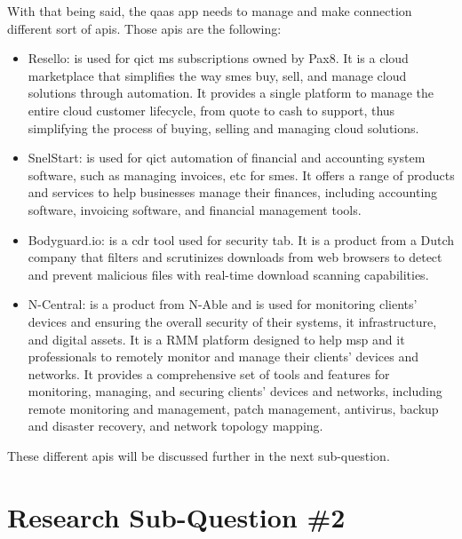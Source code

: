 \begin{multicols}{2}
      With that being said, the \acrshort{qaas} app needs to manage and make connection different sort of \acrshort{api}s.
      Those \acrshort{api}s are the following:
      \begin{itemize}
            \item Resello: is used for \acrshort{qict} \acrshort{ms} subscriptions owned by Pax8. It is a cloud
                  marketplace that simplifies the way \acrshort{sme}s buy, sell, and manage cloud solutions through
                  automation. It provides a single platform to manage the entire cloud customer lifecycle, from
                  quote to cash to support, thus simplifying the process of buying, selling and managing cloud
                  solutions.
            \item SnelStart: is used for \acrshort{qict} automation of financial and accounting system software,
                  such as managing invoices, \acrshort{etc} for \acrshort{sme}s. It offers a range of products and 
                  services to help businesses manage their finances, including accounting software, invoicing software, 
                  and financial management tools.
            \item Bodyguard.io: is a \acrshort{cdr} tool used for security tab. It is a product from a Dutch company 
                  that filters and scrutinizes downloads from web browsers to detect and prevent malicious files with 
                  real-time download scanning capabilities.
            \item N-Central: is a product from N-Able and is used for monitoring clients' devices and ensuring the
                  overall security of their systems, \acrshort{it} infrastructure, and digital assets. It is a
                  \gls{RMM} platform designed to help \acrshort{msp} and \acrshort{it} professionals to
                  remotely monitor and manage their clients' devices and networks. It provides a comprehensive
                  set of tools and features for monitoring, managing, and securing clients' devices and networks,
                  including remote monitoring and management, patch management, antivirus, backup and disaster
                  recovery, and network topology mapping.
      \end{itemize}
      These different \acrshort{api}s will be discussed further in the next sub-question.
      \section{Research Sub-Question \#2}

\end{multicols}
